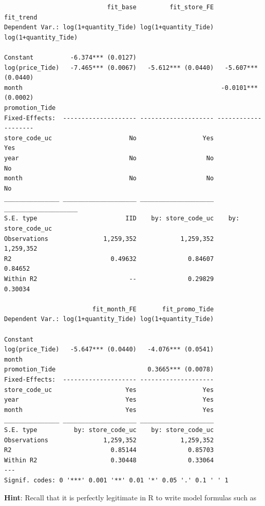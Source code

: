 \documentclass[
]{article}
\begin{document}
\begin{verbatim}
                            fit_base         fit_store_FE            fit_trend
Dependent Var.: log(1+quantity_Tide) log(1+quantity_Tide) log(1+quantity_Tide)
                                                                              
Constant          -6.374*** (0.0127)                                          
log(price_Tide)   -7.465*** (0.0067)   -5.612*** (0.0440)   -5.607*** (0.0440)
month                                                      -0.0101*** (0.0002)
promotion_Tide                                                                
Fixed-Effects:  -------------------- -------------------- --------------------
store_code_uc                     No                  Yes                  Yes
year                              No                   No                   No
month                             No                   No                   No
_______________ ____________________ ____________________ ____________________
S.E. type                        IID    by: store_code_uc    by: store_code_uc
Observations               1,259,352            1,259,352            1,259,352
R2                           0.49632              0.84607              0.84652
Within R2                         --              0.29829              0.30034

                        fit_month_FE       fit_promo_Tide
Dependent Var.: log(1+quantity_Tide) log(1+quantity_Tide)
                                                         
Constant                                                 
log(price_Tide)   -5.647*** (0.0440)   -4.076*** (0.0541)
month                                                    
promotion_Tide                         0.3665*** (0.0078)
Fixed-Effects:  -------------------- --------------------
store_code_uc                    Yes                  Yes
year                             Yes                  Yes
month                            Yes                  Yes
_______________ ____________________ ____________________
S.E. type          by: store_code_uc    by: store_code_uc
Observations               1,259,352            1,259,352
R2                           0.85144              0.85703
Within R2                    0.30448              0.33064
---
Signif. codes: 0 '***' 0.001 '**' 0.01 '*' 0.05 '.' 0.1 ' ' 1
\end{verbatim}

\bigskip

\textbf{Hint}: Recall that it is perfectly legitimate in R to write
model formulas such as
\end{document}
